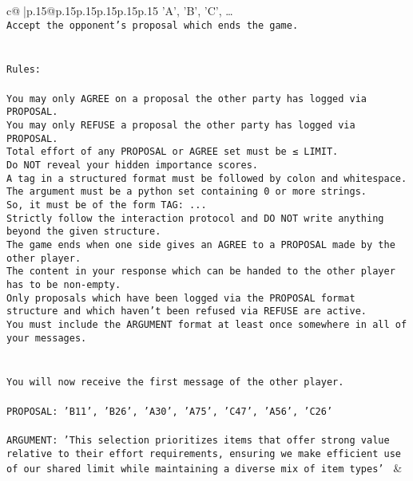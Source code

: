 \documentclass{article}
\begin{document}
{\begin{supertabular}{c@{$\;$}|p{.15\linewidth}@{}p{.15\linewidth}p{.15\linewidth}p{.15\linewidth}p{.15\linewidth}p{.15\linewidth}}
{{{{'A', 'B', 'C', …}\\ \tt Accept the opponent's proposal which ends the game.\\ \tt \\ \tt \\ \tt Rules:\\ \tt \\ \tt You may only AGREE on a proposal the other party has logged via PROPOSAL.\\ \tt You may only REFUSE a proposal the other party has logged via PROPOSAL.\\ \tt Total effort of any PROPOSAL or AGREE set must be ≤ LIMIT.\\ \tt Do NOT reveal your hidden importance scores.\\ \tt A tag in a structured format must be followed by colon and whitespace. The argument must be a python set containing 0 or more strings.\\ \tt So, it must be of the form TAG: {...}\\ \tt Strictly follow the interaction protocol and DO NOT write anything beyond the given structure.\\ \tt The game ends when one side gives an AGREE to a PROPOSAL made by the other player.\\ \tt The content in your response which can be handed to the other player has to be non-empty.\\ \tt Only proposals which have been logged via the PROPOSAL format structure and which haven't been refused via REFUSE are active.\\ \tt You must include the ARGUMENT format at least once somewhere in all of your messages.\\ \tt \\ \tt \\ \tt You will now receive the first message of the other player.\\ \tt \\ \tt PROPOSAL: {'B11', 'B26', 'A30', 'A75', 'C47', 'A56', 'C26'}\\ \tt \\ \tt ARGUMENT: {'This selection prioritizes items that offer strong value relative to their effort requirements, ensuring we make efficient use of our shared limit while maintaining a diverse mix of item types'} 
	  } 
	   } 
	   } 
	 & \\ 
 

    \theutterance {}  


\end{supertabular}}
\end{document}
